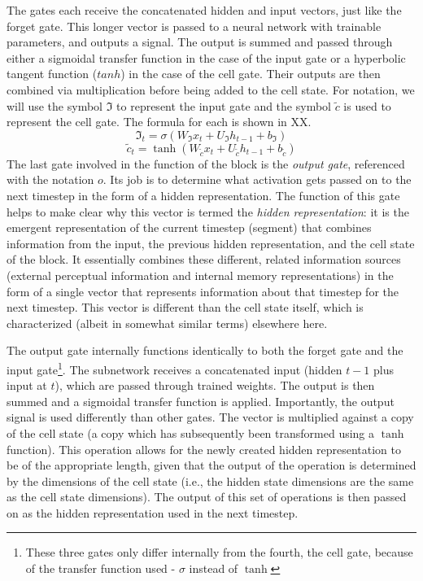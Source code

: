 \documentclass[
  american,
  man,floatsintext]{apa6}
\begin{document}
The gates each receive the concatenated hidden and input vectors, just like the forget gate. This longer vector is passed to a neural network with trainable parameters, and outputs a signal. The output is summed and passed through either a sigmoidal transfer function in the case of the input gate or a hyperbolic tangent function (\(tanh\)) in the case of the cell gate. Their outputs are then combined via multiplication before being added to the cell state. For notation, we will use the symbol \(\Im\) to represent the input gate and the symbol \(\tilde{c}\) is used to represent the cell gate. The formula for each is shown in XX.
\[
\Im_t = \sigma(W_{\Im}x_t + U_{\Im}h_{t-1} + b_{\Im})
\]
\[
\tilde{c}_t = \tanh(W_{\tilde{c}}x_t + U_{\tilde{c}}h_{t-1} + b_{\tilde{c}})
\]
The last gate involved in the function of the block is the \emph{output gate}, referenced with the notation \(o\). Its job is to determine what activation gets passed on to the next timestep in the form of a hidden representation. The function of this gate helps to make clear why this vector is termed the \emph{hidden representation}: it is the emergent representation of the current timestep (segment) that combines information from the input, the previous hidden representation, and the cell state of the block. It essentially combines these different, related information sources (external perceptual information and internal memory representations) in the form of a single vector that represents information about that timestep for the next timestep. This vector is different than the cell state itself, which is characterized (albeit in somewhat similar terms) elsewhere here.

The output gate internally functions identically to both the forget gate and the input gate\footnote{These three gates only differ internally from the fourth, the cell gate, because of the transfer function used - \(\sigma\) instead of \(\tanh\)}. The subnetwork receives a concatenated input (hidden \(t-1\) plus input at \(t\)), which are passed through trained weights. The output is then summed and a sigmoidal transfer function is applied. Importantly, the output signal is used differently than other gates. The vector is multiplied against a copy of the cell state (a copy which has subsequently been transformed using a \(\tanh\) function). This operation allows for the newly created hidden representation to be of the appropriate length, given that the output of the operation is determined by the dimensions of the cell state (i.e., the hidden state dimensions are the same as the cell state dimensions). The output of this set of operations is then passed on as the hidden representation used in the next timestep.
\end{document}
